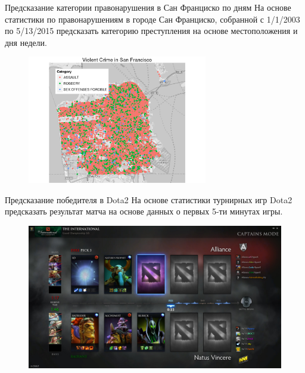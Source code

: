 \documentclass{beamer}
\begin{document}
\begin{frame}{Предсказание категории правонарушения в Сан Франциско по дням}
    На основе статистики по правонарушениям в городе Сан Франциско, собранной с 1/1/2003 по 5/13/2015 предсказать категорию преступления на основе местоположения и дня недели.
    \begin{figure}
        \includegraphics[width=0.7\textwidth]{fig/SanFranciscoCrimes.png}
    \end{figure}
\end{frame}

\begin{frame}{Предсказание победителя в Dota2}
    На основе статистики турнирных игр Dota2 предсказать результат матча на основе данных о первых 5-ти минутах игры.
    \begin{figure}
        \includegraphics[width=\textwidth]{fig/dota2.jpg}
    \end{figure}
\end{frame}
\end{document}

